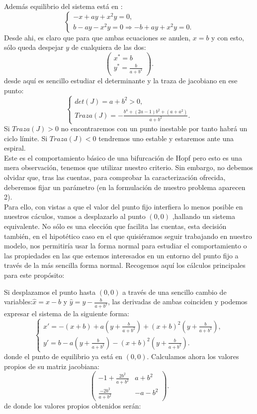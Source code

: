 Además equilibrio del sistema está en :
\[\left\lbrace  \begin{array}{ccc}
-x+ay+x^2y=0,  \\
b-ay-x^2y=0\Rightarrow -b+ay+x^2y=0.
\end{array} \right.
\]
Desde ahi, es claro que para que ambas ecuaciones se anulen, $x=b$ y con esto, sólo queda despejar $y$ de cualquiera de las dos:
\[\begin{pmatrix}
x^*=b \\
y^*=\frac{b}{a+b^2}
\end{pmatrix}.
\]
desde aquí es sencillo estudiar el determinante y la traza de jacobiano en ese punto:
\[\left\lbrace  \begin{array}{ccc}
det(J)=a+b^2>0,  \\
Traza(J)=-\frac{b^4+(2a-1)b^2+(a+a^2)}{a+b^2}.
\end{array} \right.
\]
Si $Traza(J)>0$ no encontraremos con un punto inestable por tanto habrá un ciclo límite. Si $Traza(J)<0$ tendremos uno estable y estaremos ante una espiral.\\
Este es el comportamiento básico de una bifurcación de Hopf pero esto es una mera observación, tenemos que utilizar nuestro criterio. Sin embargo, no debemos olvidar que, tras las cuentas, para comprobar la caracterización ofrecida, deberemos fijar un parámetro (en la formulación de nuestro problema aparecen 2).
 \\
Para ello, con vistas a que el valor del punto fijo interfiera lo menos posible en nuestros cáculos, vamos a desplazarlo al punto $(0,0)$ ,hallando un sistema equivalente. No sólo es una elección que facilita las cuentas, esta decisión también, en el hipotético caso en el que quisiéramos seguir trabajando en nuestro modelo, nos permitiría usar la forma normal para estudiar el comportamiento o las propiedades en las que estemos interesados en un entorno del punto fijo a través de la más sencilla forma normal.
Recogemos aquí los cálculos principales para este propósito:

Si desplazamos el punto hasta $(0,0)$ a través de una sencillo cambio de variables:$\hat{x}=x-b$ y $\hat{y}=y-\frac{b}{a+b^2}$, las derivadas de ambas coinciden y podemos expresar el sistema de la siguiente forma:
\[ \left \{ \begin{matrix} x'=-(x+b)+a(y+\frac{b}{a+b^2})+(x+b)^2(y+\frac{b}{a+b^2}),\\ y'=b-a(y+\frac{b}{a+b^2})-(x+b)^2(y+\frac{b}{a+b^2}). \end{matrix}\right . \]
donde el punto de equilibrio ya está en $(0,0)$.
Calculamos ahora los valores propios de su matriz jacobiana:
\[\begin{pmatrix}
-1+\frac{2b^2}{a+b^2} & a+b^2 \\\frac{-2b^2}{a+b^2} & -a-b^2
\end{pmatrix}.
\]
 de donde los valores propios obtenidos serán:

